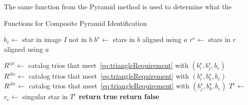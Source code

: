 The same function  from the
Pyramid method is used to determine what the
\begin{algorithm}
    \caption{Functions for Composite Pyramid Identification} \label{algorithm:compositePyramidHelpers}
    \begin{algorithmic}[1]
        \State $b_e \gets $ star in image $I$ not in $b$
        \State $b^{\star} \gets $ stars in $b$ aligned using $a$
        \State $r^{\star} \gets $ stars in $r$ aligned using $a$

        \State $R^{ije} \gets $ catalog trios that meet~\eqref{eq:triangleRequirement} with $(b^{\star}_i, b^{\star}_j,
        b_e)$
        \State $R^{ike} \gets $ catalog trios that meet~\eqref{eq:triangleRequirement} with $(b^{\star}_i, b^{\star}_k,
        b_e)$
        \State $R^{jke} \gets $ catalog trios that meet~\eqref{eq:triangleRequirement} with $(b^{\star}_j, b^{\star}_k,
        b_e)$
        \State $T^e \gets $ 
        \State $r_e \gets $ singular star in $T^e$
        \State \textbf{return true}
        \EndIf
        \EndIf
        \State \textbf{return false}
        \EndFunction
    \end{algorithmic}
\end{algorithm}

